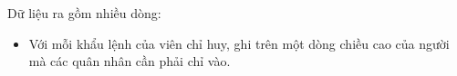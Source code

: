 Dữ liệu ra gồm nhiều dòng:  
\begin{itemize}
	\item     Với mỗi khẩu lệnh của viên chỉ huy, ghi trên một dòng  chiều cao của người mà các quân nhân cần phải chỉ vào.   
\end{itemize}



\
